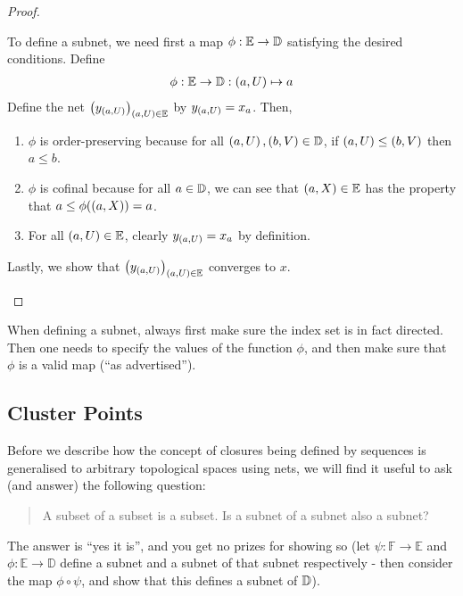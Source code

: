 \begin{proof}
\begin{description}
        To define a subnet, we need first a map $\phi : \mathbb{E} \to \mathbb{D}$ satisfying the desired conditions. Define
        \begin{align*}
            \phi : \mathbb{E} \to \mathbb{D} : \left( a, U \right) \mapsto a
        \end{align*}
        Define the net $\left( y_{\left( a, U \right)} \right)_{\left( a, U \right) \in \mathbb{E}}$ by $y_{\left( a, U \right)} = x_a$. Then,
        \begin{enumerate}
            \item $\phi$ is order-preserving because for all $\left( a, U \right), \left( b, V \right) \in \mathbb{D}$, if $\left( a, U \right) \leq \left( b, V \right)$ then $a \leq b$.
            \item $\phi$ is cofinal because for all $a \in \mathbb{D}$, we can see that $\left( a, X \right) \in \mathbb{E}$ has the property that $a \leq \phi\!\left( \left( a, X \right) \right) = a$.
            \item For all $\left( a, U \right) \in \mathbb{E}$, clearly $y_{\left( a, U \right)} = x_a$ by definition.
        \end{enumerate}
        Lastly, we show that $\left( y_{\left( a, U \right)} \right)_{\left( a, U \right) \in \mathbb{E}}$ converges to $x$.
        \sorry
    \end{description}
\end{proof}
\begin{boxwarning}
    When defining a subnet, always first make sure the index set is in fact directed. Then one needs to  specify the values of the function $\phi$, and then make sure that $\phi$ is a valid map (``as advertised'').
\end{boxwarning}


\subsection{Cluster Points}

Before we describe how the concept of closures being defined by sequences is generalised to arbitrary topological spaces using nets, we will find it useful to ask (and answer) the following question:
\begin{quote}
    \centering
    A subset of a subset is a subset. Is a subnet of a subnet also a subnet? 
\end{quote}
\begin{remark}
    The answer is ``yes it is'', and you get no prizes for showing so (let $\psi:\mathbb{F}\rightarrow \mathbb{E}$ and $\phi:\mathbb{E}\rightarrow \mathbb{D}$ define a subnet and a subnet of that subnet respectively - then consider the map $\phi\circ \psi$, and show that this defines a subnet of $\mathbb{D}$).
\end{remark}

